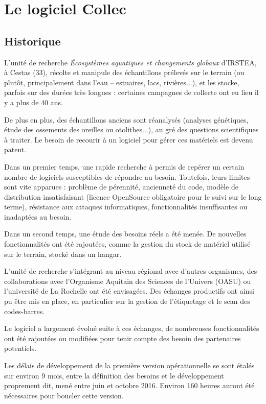 \chapter{Le logiciel Collec}
\section{Historique}

L'unité de recherche \textit{Écosystèmes aquatiques et changements globaux} d'IRSTEA, à Cestas (33), récolte et manipule des échantillons prélevés sur le terrain (ou plutôt, principalement dans l'eau -- estuaires, lacs, rivières...), et les stocke, parfois sur des durées très longues : certaines campagnes de collecte ont eu lieu il y a plus de 40 ans.

De plus en plus, des échantillons anciens sont réanalysés (analyses génétiques, étude des ossements des oreilles ou otolithes...), au gré des questions scientifiques à traiter. 
Le besoin de recourir à un logiciel pour gérer ces matériels est devenu patent.

Dans un premier temps, une rapide recherche à permis de repérer un certain nombre de logiciels susceptibles de répondre au besoin. Toutefois, leurs limites sont vite apparues : problème de pérennité, ancienneté du code, modèle de distribution insatisfaisant (licence OpenSource obligatoire pour le suivi sur le long terme), résistance aux attaques informatiques, fonctionnalités insuffisantes ou inadaptées au besoin.

Dans un second temps, une étude des besoins réels a été menée. De nouvelles fonctionnalités ont été rajoutées, comme la gestion du stock de matériel utilisé sur le terrain, stocké dans un hangar.

L'unité de recherche s'intégrant au niveau régional avec d'autres organismes, des collaborations avec l'Organisme Aquitain des Sciences de l'Univers (OASU) ou l'université de La Rochelle ont été envisagées.
Des échanges productifs ont ainsi pu être mis en place, en particulier sur la gestion de l'étiquetage et le scan des codes-barres.

Le logiciel a largement évolué suite à ces échanges, de nombreuses fonctionnalités ont été rajoutées ou modifiées pour tenir compte des besoin des partenaires potentiels. 

Les délais de développement de la première version opérationnelle se sont étalés sur environ 9 mois, entre la définition des besoins et le développement proprement dit, mené entre juin et octobre 2016. Environ 160 heures auront été nécessaires pour boucler cette version.

